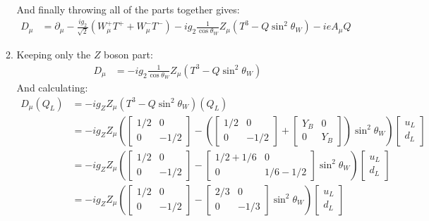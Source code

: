\documentclass[12pt,a4]{article}
\begin{document}
\begin{enumerate}
\begin{enumerate}
\begin{align*}
        \end{align*}
        And finally throwing all of the parts together gives:
        \begin{align*}
          D_\mu &= \partial_\mu - \frac{ig_2}{\sqrt{2}} (W^+_\mu T^+ + W^-_\mu T^-) -ig_2 \frac{1}{\cos \theta_W }Z_\mu (T^3 - Q \sin^2 \theta_W) - i e A_\mu Q
        \end{align*}
      \item
        Keeping only the $Z$ boson part:
        \begin{align*}
          D_\mu &= - ig_2 \frac{1}{\cos \theta_W }Z_\mu (T^3 - Q \sin^2 \theta_W)
        \end{align*}
        And calculating:
        \begin{align*}
          D_\mu(Q_L) &= - ig_Z Z_\mu (T^3 - Q \sin^2 \theta_W) (Q_L)\\
                     &= - ig_Z Z_\mu \left(\left[\begin{matrix} 1/2 & 0 \\ 0 & -1/2\end{matrix}\right] - \left(\left[\begin{matrix} 1/2 & 0 \\ 0 & -1/2\end{matrix}\right] + \left[\begin{matrix} Y_B & 0 \\ 0 & Y_B\end{matrix}\right]\right) \sin^2 \theta_W\right) \left[\begin{matrix} u_L \\ d_L\end{matrix}\right]\\
                     &= - ig_Z Z_\mu \left(\left[\begin{matrix} 1/2 & 0 \\ 0 & -1/2\end{matrix}\right] - \left[\begin{matrix} 1/2 + 1/6 & 0 \\ 0 & 1/6 - 1/2\end{matrix}\right]  \sin^2 \theta_W\right) \left[\begin{matrix} u_L \\ d_L\end{matrix}\right]\\
                     &= - ig_Z Z_\mu \left(\left[\begin{matrix} 1/2 & 0 \\ 0 & -1/2\end{matrix}\right] - \left[\begin{matrix} 2/3 & 0 \\ 0 & -1/3 \end{matrix}\right]  \sin^2 \theta_W\right) \left[\begin{matrix} u_L \\ d_L\end{matrix}\right]\\

\end{align*}
\end{enumerate}
\end{enumerate}
\end{document}
